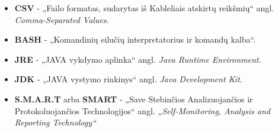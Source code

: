 \documentclass{VUMIFPSkursinis}
\begin{document}
\begin{itemize}
\item \textbf{CSV} - „Failo formatas, sudarytas iš Kableliais atskirtų reikšmių“ angl. \textit{Comma-Separated Values}.

\item \textbf{BASH} - „Komandinių eilučių interpretatorius ir komandų kalba“.

\item \textbf{JRE} - „JAVA vykdymo aplinka“ angl. \textit{Java Runtime Environment}.

\item \textbf{JDK} - „JAVA vystymo rinkinys“ angl. \textit{Java Development Kit}.

\item \textbf{S.M.A.R.T} arba \textbf{SMART} - „Save Stebinčios Analizuojančios ir Protokoluojančios Technologijos“ angl. \textit{„Self-Monitoring, Analysis and Reporting Technology“}

\end{itemize}

\appendix
\end{document}
